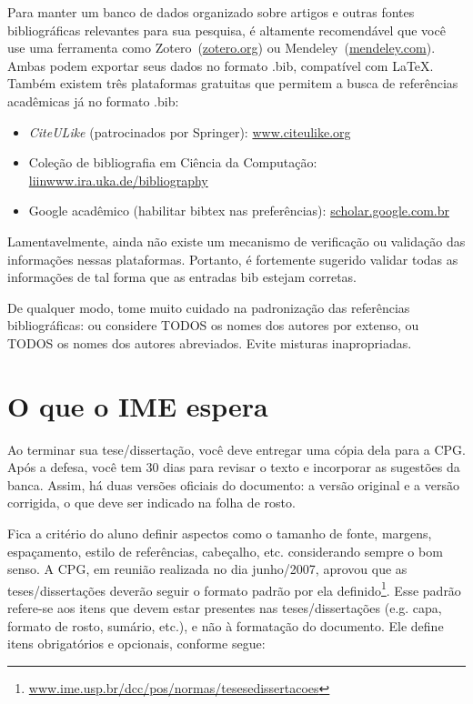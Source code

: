 Para manter um banco de dados organizado sobre artigos e outras fontes bibliográficas
relevantes para sua pesquisa, é altamente recomendável que você use uma ferramenta
como Zotero~(\url{zotero.org}) ou Mendeley~(\url{mendeley.com}). Ambas podem exportar
seus dados no formato .bib, compatível com \LaTeX{}. Também existem três plataformas
gratuitas que permitem a busca de referências acadêmicas já no formato .bib:

\begin{itemize}
  \item \emph{CiteULike} (patrocinados por Springer): \url{www.citeulike.org}
  \item Coleção de bibliografia em Ciência da Computação: \url{liinwww.ira.uka.de/bibliography}
  \item Google acadêmico (habilitar bibtex nas preferências): \url{scholar.google.com.br}
\end{itemize}

Lamentavelmente, ainda não existe um mecanismo de verificação ou validação das
informações nessas plataformas. Portanto, é fortemente sugerido validar todas
as informações de tal forma que as entradas bib estejam corretas.

De qualquer modo, tome muito cuidado na padronização das referências
bibliográficas: ou considere TODOS os nomes dos autores por extenso, ou TODOS
os nomes dos autores abreviados.  Evite misturas inapropriadas.

\section{O que o IME espera}

Ao terminar sua tese/dissertação, você deve entregar uma cópia dela para a
CPG. Após a defesa, você tem 30 dias para revisar o texto e incorporar as
sugestões da banca. Assim, há duas versões oficiais do documento: a versão
original e a versão corrigida, o que deve ser indicado na folha de rosto.

Fica a critério do aluno definir aspectos como o tamanho de fonte, margens,
espaçamento, estilo de referências, cabeçalho, etc. considerando sempre o
bom senso. A CPG, em reunião realizada no dia junho/2007, aprovou que as
teses/dissertações deverão seguir o formato padrão por ela
definido\footnote{\url{www.ime.usp.br/dcc/pos/normas/tesesedissertacoes}}.
Esse padrão refere-se aos itens que devem estar presentes nas teses/dissertações
(e.g. capa, formato de rosto, sumário, etc.), e não à formatação do documento.
Ele define itens obrigatórios e opcionais, conforme segue:


